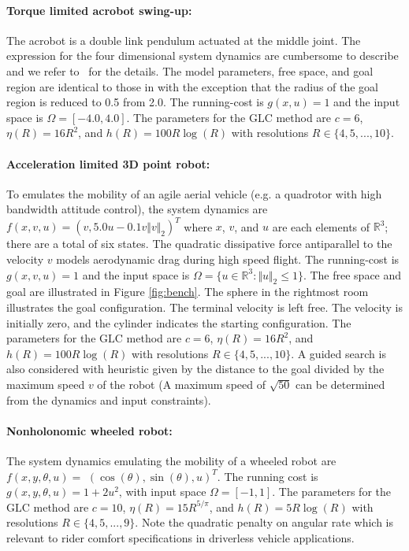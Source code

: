 \documentclass{llncs}
\newcommand{\GLC}{\ensuremath{\mathrm{GLC}}\xspace}
\begin{document}
\paragraph*{Torque limited acrobot swing-up: }

The acrobot is a double link pendulum actuated at the middle joint. 
%
The expression for the four dimensional system dynamics are cumbersome to describe and we refer to~\cite{spong1995swing} for the details. 
%
The model parameters, free space, and goal region are identical to those in \cite{BBekris2015} with the exception that the radius of the goal region is reduced to 0.5 from 2.0.
%
The running-cost is $g(x,u)=1$ and the input space is $\Omega=[-4.0,4.0]$. 
%
The parameters for the \GLC method are $c=6$, $\eta(R)=16R^{2}$, and $h(R)=100R\log(R)$ with resolutions $R\in \{4,5,...,10\}$.


\paragraph*{Acceleration limited 3D point robot: }

To emulates the mobility of an agile aerial vehicle (e.g. a quadrotor with high bandwidth attitude control), the system dynamics are $f(x,v,u)=(v,5.0u-0.1v\Vert v\Vert_{2})^{T}$ where $x$, $v$, and $u$ are each elements of $\mathbb{R}^{3}$; there are a total of six states. 
%
The quadratic dissipative force antiparallel to the velocity $v$ models aerodynamic drag during high speed flight.
%
The running-cost is $g(x,v,u)=1$ and the input space is $\Omega=\{u\in\mathbb{R}^{3}:\Vert u\Vert_{2}\leq1\}$.
%
The free space and goal are illustrated in Figure \ref{fig:bench}. 
%
The sphere in the rightmost room illustrates the goal configuration. The terminal velocity is left free. The velocity is initially zero, and the cylinder indicates the starting configuration.
%
The parameters for the \GLC method are $c=6$, $\eta(R)=16R^{2}$, and $h(R)=100R\log(R)$ with resolutions $R\in \{4,5,...,10\}$.
%
A guided search is also considered with heuristic given by the distance to the goal divided by the maximum speed $v$ of the robot (A maximum speed of $\sqrt{{50}}$ can be determined from the dynamics and input constraints). 
%
 



\paragraph*{Nonholonomic wheeled robot:}

The system dynamics emulating the mobility of a wheeled robot are $f(x,y,\theta,u)=$  $(\cos(\theta),\sin(\theta),u)^{T}$. 
%
The running cost is $g(x,y,\theta,u)=1+2u^{2}$, with input space $\Omega=[-1,1]$.
%
The parameters for the \GLC method are $c=10$, $\eta(R)=15R^{5/\pi}$, and $h(R)=5R\log(R)$ with resolutions $R\in \{4,5,...,9\}$.
%
Note the quadratic penalty on angular rate which is relevant to rider comfort specifications in driverless vehicle applications.
\end{document}
